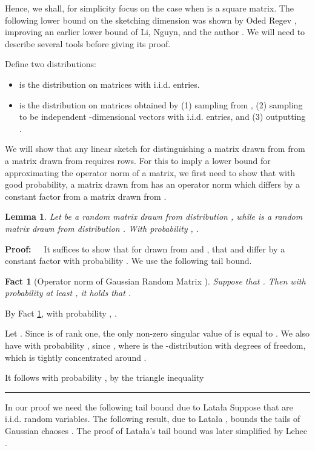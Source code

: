 \documentclass[11pt]{article}
\newtheorem{lemma}[theorem]{Lemma}
\newenvironment{proof}{\begin{trivlist} \item {\bf Proof:~~}}
  {\qed\end{trivlist}}
\def\qed{\hfill\rule{2mm}{2mm}}
\newtheorem{fact}{Fact}
\begin{document}
Hence, we shall, for simplicity focus on the case when  is a square  matrix. The following
 lower bound on the sketching dimension  was shown by Oded Regev \cite{r14}, improving an 
earlier  lower bound of Li, Nguyn, and the author \cite{lnw14}. We will need to describe
several tools before giving its proof. 

Define two distributions: 
\begin{itemize}
\item  is the distribution on  matrices with i.i.d.  entries. 
\item  is the distribution on  matrices obtained by 
(1) sampling  from , (2) sampling  to be independent -dimensional
vectors with i.i.d.  entries, and (3) outputting .
\end{itemize}

We will show that any linear sketch  for 
distinguishing a matrix drawn from  from a matrix drawn from 
 requires  rows. For this to imply a lower bound for approximating the operator norm of
a matrix, we first need to show that with good probability, a matrix drawn from  has an operator
norm which differs by a constant factor from a matrix drawn from . 

\begin{lemma}\label{lem:gap}
Let  be a random matrix drawn from distribution , while  is a random matrix drawn from distribution .
With probability , .   
\end{lemma}
\begin{proof}
It suffices to show that for  drawn from  and , that 
 and  differ by a constant factor with probability . 
We use the following tail bound. 
\begin{fact}[Operator norm of Gaussian Random Matrix  \cite{vershynin2010}]\label{lem:operator norm}
Suppose that . Then with probability at least , it holds that .
\end{fact}
By Fact \ref{lem:operator norm}, with probability , . 

Let . 
Since  is of rank one, the only non-zero singular value of  is equal to . We also have 
 with probability , 
since , where  is the -distribution with  degrees of freedom,
which is tightly concentrated around .

It follows with probability , by the triangle inequality

\end{proof}

In our proof we need the following tail bound due to Lata{\l}a
Suppose that  are i.i.d.  random variables. The following result, due to Lata\l{}a \cite{latala}, bounds the tails of Gaussian chaoses . The proof of Lata\l{}a's tail bound was later simplified by Lehec \cite{Lehec}.
\end{document}
